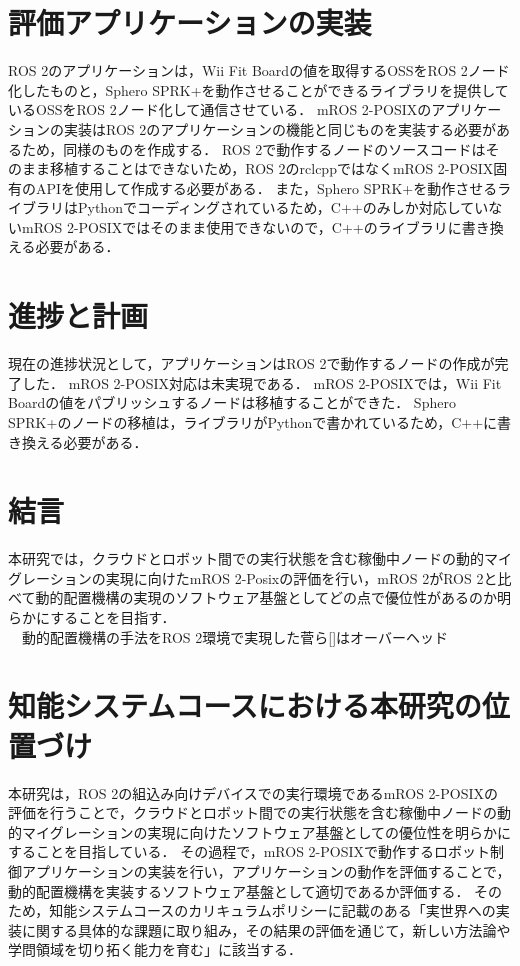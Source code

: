 \documentclass[11pt]{ujarticle}
\begin{document}
\section{評価アプリケーションの実装}
ROS 2のアプリケーションは，Wii Fit Boardの値を取得するOSSをROS 2ノード化したものと，Sphero SPRK+を動作させることができるライブラリを提供しているOSSをROS 2ノード化して通信させている．
mROS 2-POSIXのアプリケーションの実装はROS 2のアプリケーションの機能と同じものを実装する必要があるため，同様のものを作成する．
ROS 2で動作するノードのソースコードはそのまま移植することはできないため，ROS 2のrclcppではなくmROS 2-POSIX固有のAPIを使用して作成する必要がある．
また，Sphero SPRK+を動作させるライブラリはPythonでコーディングされているため，C++のみしか対応していないmROS 2-POSIXではそのまま使用できないので，C++のライブラリに書き換える必要がある．
\section{進捗と計画}
現在の進捗状況として，アプリケーションはROS 2で動作するノードの作成が完了した．
mROS 2-POSIX対応は未実現である．
mROS 2-POSIXでは，Wii Fit Boardの値をパブリッシュするノードは移植することができた．
Sphero SPRK+のノードの移植は，ライブラリがPythonで書かれているため，C++に書き換える必要がある．

\section{結言}
本研究では，クラウドとロボット間での実行状態を含む稼働中ノードの動的マイグレーションの実現に向けたmROS 2-Posixの評価を行い，mROS 2がROS 2と比べて動的配置機構の実現のソフトウェア基盤としてどの点で優位性があるのか明らかにすることを目指す．
\\　動的配置機構の手法をROS 2環境で実現した菅ら[]はオーバーヘッド


\section{知能システムコースにおける本研究の位置づけ}
本研究は，ROS 2の組込み向けデバイスでの実行環境であるmROS 2-POSIXの評価を行うことで，クラウドとロボット間での実行状態を含む稼働中ノードの動的マイグレーションの実現に向けたソフトウェア基盤としての優位性を明らかにすることを目指している．
その過程で，mROS 2-POSIXで動作するロボット制御アプリケーションの実装を行い，アプリケーションの動作を評価することで，動的配置機構を実装するソフトウェア基盤として適切であるか評価する．
そのため，知能システムコースのカリキュラムポリシーに記載のある「実世界への実装に関する具体的な課題に取り組み，その結果の評価を通じて，新しい方法論や学問領域を切り拓く能力を育む」に該当する．
\end{document}

